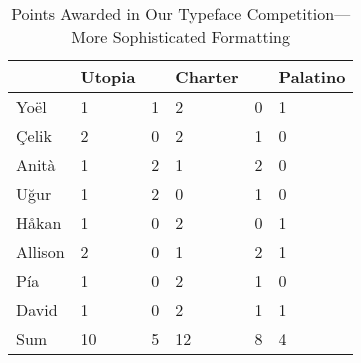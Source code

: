 \begin{table}[b]
	\caption{Points Awarded in Our Typeface Competition---More Sophisticated Formatting}
	\label{tab:advanced_formatting}
	\renewcommand\cellalign{ct}
	\begin{tabularx}{\textwidth}{ @{} L *{5}{T{2.0}} }
		\toprule
			&	{Utopia}
			&	{}
			&	{Charter}
			&	{}
			&	{Palatino}
			\\
		\midrule
		Yo\"{e}l  	& 	1	&	1	&	2	&	0	&	1	\\
		\c{C}elik	&	2	&	0	&	2	&	1	&	0	\\
		Anit\`{a}	&	1	&	2	&	1	&	2	&	0	\\
		U\u{g}ur	&	1	&	2	&	0	&	1	&	0	\\
		H\r{a}kan	&	1	&	0	&	2	&	0	&	1	\\
		Allison		&	2	&	0	&	1	&	2	&	1	\\
		P\'ia		&	1	&	0	&	2	&	1	&	0	\\
		David		&	1	&	0	&	2	&	1	&	1	\\
		\midrule
		Sum			&  10	&	5	&	12	&	8	&	4	\\
		\bottomrule
	\end{tabularx}
	\parnotes%
\end{table}